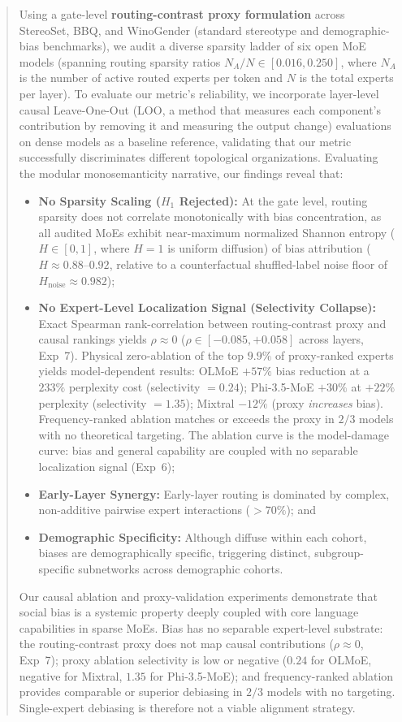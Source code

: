 \documentclass[11pt,a4paper]{article}
\begin{document}
\begin{abstract}
Using a gate-level \textbf{routing-contrast proxy formulation} across StereoSet, BBQ, and WinoGender (standard stereotype and demographic-bias benchmarks), we audit a diverse sparsity ladder of six open MoE models (spanning routing sparsity ratios $N_A/N \in [0.016, 0.250]$, where $N_A$ is the number of active routed experts per token and $N$ is the total experts per layer). To evaluate our metric's reliability, we incorporate layer-level causal Leave-One-Out (LOO, a method that measures each component's contribution by removing it and measuring the output change) evaluations on dense models as a baseline reference, validating that our metric successfully discriminates different topological organizations. Evaluating the modular monosemanticity narrative, our findings reveal that:
\begin{itemize}
    \item \textbf{No Sparsity Scaling ($H_1$ Rejected):} At the gate level, routing sparsity does not correlate monotonically with bias concentration, as all audited MoEs exhibit near-maximum normalized Shannon entropy ($H \in [0,1]$, where $H=1$ is uniform diffusion) of bias attribution ($H \approx 0.88$--$0.92$, relative to a counterfactual shuffled-label noise floor of $H_{\text{noise}} \approx 0.982$);
    \item \textbf{No Expert-Level Localization Signal (Selectivity Collapse):} Exact Spearman rank-correlation between routing-contrast proxy and causal rankings yields $\rho \approx 0$ ($\rho \in [-0.085, +0.058]$ across layers, Exp~7). Physical zero-ablation of the top $9.9\%$ of proxy-ranked experts yields model-dependent results: OLMoE $+57\%$ bias reduction at a $233\%$ perplexity cost (selectivity $= 0.24$); Phi-3.5-MoE $+30\%$ at $+22\%$ perplexity (selectivity $= 1.35$); Mixtral $-12\%$ (proxy \emph{increases} bias). Frequency-ranked ablation matches or exceeds the proxy in $2/3$ models with no theoretical targeting. The ablation curve is the model-damage curve: bias and general capability are coupled with no separable localization signal (Exp~6);
    \item \textbf{Early-Layer Synergy:} Early-layer routing is dominated by complex, non-additive pairwise expert interactions ($>70\%$); and
    \item \textbf{Demographic Specificity:} Although diffuse within each cohort, biases are demographically specific, triggering distinct, subgroup-specific subnetworks across demographic cohorts.
\end{itemize}
Our causal ablation and proxy-validation experiments demonstrate that social bias is a systemic property deeply coupled with core language capabilities in sparse MoEs. Bias has no separable expert-level substrate: the routing-contrast proxy does not map causal contributions ($\rho \approx 0$, Exp~7); proxy ablation selectivity is low or negative ($0.24$ for OLMoE, negative for Mixtral, $1.35$ for Phi-3.5-MoE); and frequency-ranked ablation provides comparable or superior debiasing in $2/3$ models with no targeting. Single-expert debiasing is therefore not a viable alignment strategy.
\end{abstract}
\end{document}
